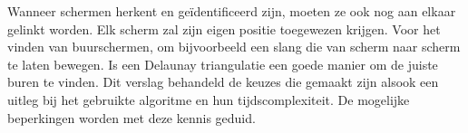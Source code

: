 Wanneer schermen herkent en geïdentificeerd zijn, moeten ze ook nog aan elkaar gelinkt worden. Elk scherm zal zijn eigen positie toegewezen krijgen. Voor het vinden van buurschermen, om bijvoorbeeld een slang die van scherm naar scherm te laten bewegen. Is een Delaunay triangulatie een goede manier om de juiste buren te vinden. Dit verslag behandeld de keuzes die gemaakt zijn alsook een uitleg bij het gebruikte algoritme en hun tijdscomplexiteit. De mogelijke beperkingen worden met deze kennis geduid.
